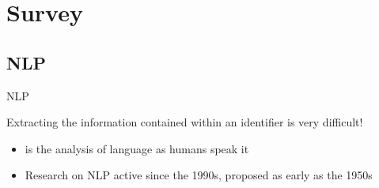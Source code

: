 

\section*{Survey}
\label{sec:Survey}

\subsection{\acl{NLP}}
\label{ssec:Survey-NLP}

\begin{frame}{\acl{NLP}}
    \begin{m-problem}
        Extracting the information contained within an identifier is very difficult!
    \end{m-problem}

    \vspace*{\baselineskip}

    \begin{itemize}
        \setlength{\itemsep}{1ex}
        \item

         is the analysis of language as humans speak it

        \item

        Research on \acs{NLP} active since the 1990s, proposed as early as the
        1950s~\cite{Brown1990StatMT}

    \end{itemize}

\end{frame}

